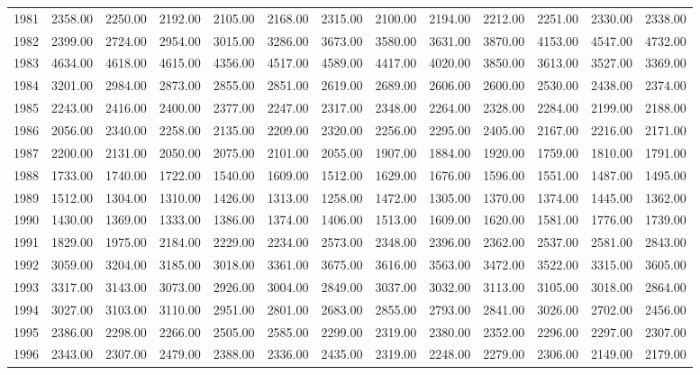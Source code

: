 \begin{longtable}{rrrrrrrrrrrrr}
  1981 & 2358.00 & 2250.00 & 2192.00 & 2105.00 & 2168.00 & 2315.00 & 2100.00 & 2194.00 & 2212.00 & 2251.00 & 2330.00 & 2338.00 \\ 
  1982 & 2399.00 & 2724.00 & 2954.00 & 3015.00 & 3286.00 & 3673.00 & 3580.00 & 3631.00 & 3870.00 & 4153.00 & 4547.00 & 4732.00 \\ 
  1983 & 4634.00 & 4618.00 & 4615.00 & 4356.00 & 4517.00 & 4589.00 & 4417.00 & 4020.00 & 3850.00 & 3613.00 & 3527.00 & 3369.00 \\ 
  1984 & 3201.00 & 2984.00 & 2873.00 & 2855.00 & 2851.00 & 2619.00 & 2689.00 & 2606.00 & 2600.00 & 2530.00 & 2438.00 & 2374.00 \\ 
  1985 & 2243.00 & 2416.00 & 2400.00 & 2377.00 & 2247.00 & 2317.00 & 2348.00 & 2264.00 & 2328.00 & 2284.00 & 2199.00 & 2188.00 \\ 
  1986 & 2056.00 & 2340.00 & 2258.00 & 2135.00 & 2209.00 & 2320.00 & 2256.00 & 2295.00 & 2405.00 & 2167.00 & 2216.00 & 2171.00 \\ 
  1987 & 2200.00 & 2131.00 & 2050.00 & 2075.00 & 2101.00 & 2055.00 & 1907.00 & 1884.00 & 1920.00 & 1759.00 & 1810.00 & 1791.00 \\ 
  1988 & 1733.00 & 1740.00 & 1722.00 & 1540.00 & 1609.00 & 1512.00 & 1629.00 & 1676.00 & 1596.00 & 1551.00 & 1487.00 & 1495.00 \\ 
  1989 & 1512.00 & 1304.00 & 1310.00 & 1426.00 & 1313.00 & 1258.00 & 1472.00 & 1305.00 & 1370.00 & 1374.00 & 1445.00 & 1362.00 \\ 
  1990 & 1430.00 & 1369.00 & 1333.00 & 1386.00 & 1374.00 & 1406.00 & 1513.00 & 1609.00 & 1620.00 & 1581.00 & 1776.00 & 1739.00 \\ 
  1991 & 1829.00 & 1975.00 & 2184.00 & 2229.00 & 2234.00 & 2573.00 & 2348.00 & 2396.00 & 2362.00 & 2537.00 & 2581.00 & 2843.00 \\ 
  1992 & 3059.00 & 3204.00 & 3185.00 & 3018.00 & 3361.00 & 3675.00 & 3616.00 & 3563.00 & 3472.00 & 3522.00 & 3315.00 & 3605.00 \\ 
  1993 & 3317.00 & 3143.00 & 3073.00 & 2926.00 & 3004.00 & 2849.00 & 3037.00 & 3032.00 & 3113.00 & 3105.00 & 3018.00 & 2864.00 \\ 
  1994 & 3027.00 & 3103.00 & 3110.00 & 2951.00 & 2801.00 & 2683.00 & 2855.00 & 2793.00 & 2841.00 & 3026.00 & 2702.00 & 2456.00 \\ 
  1995 & 2386.00 & 2298.00 & 2266.00 & 2505.00 & 2585.00 & 2299.00 & 2319.00 & 2380.00 & 2352.00 & 2296.00 & 2297.00 & 2307.00 \\ 
  1996 & 2343.00 & 2307.00 & 2479.00 & 2388.00 & 2336.00 & 2435.00 & 2319.00 & 2248.00 & 2279.00 & 2306.00 & 2149.00 & 2179.00 \\ 

\end{longtable}
